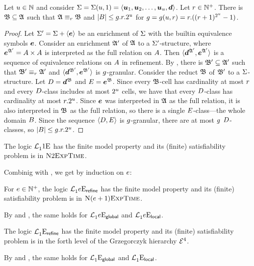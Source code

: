 \begin{remark}\label{rem:monadic-1}
Let $u \in \mathbb{N}$ and consider $\mathrm{\Sigma} = \mathrm{\Sigma}(u,1) =
\left\langle \bm{u}_{1},\bm{u}_{2},\dots,\bm{u}_{u},\bm{d} \right\rangle$. Let $r \in \mathbb{N}^{+}$.
There is $\mathfrak{B} \subseteq \mathfrak{A}$ such that $\mathfrak{A} \equiv_{r} \mathfrak{B}$ and
$\left|B\right| \leq g.r.2^u$ for $g = g(u, r) =
r.((r+1)^{2^u}-1)$.
\end{remark}
\begin{proof}
Let $\mathrm{\Sigma'} = \mathrm{\Sigma} + \left\langle \bm{e} \right\rangle$ be an enrichment of $\mathrm{\Sigma}$ with the builtin
equivalence symbols $\bm{e}$. Consider an enrichment $\mathfrak{A'}$ of $\mathfrak{A}$ to a
$\mathrm{\Sigma'}$-structure, where $\bm{e}^{\mathfrak{A'}} = {A\times A}$ is interpreted as the
full relation on $A$. Then $\langle \bm{d}^{\mathfrak{A'}}, \bm{e}^{\mathfrak{A'}} \rangle$ is a
sequence of equivalence relations on $A$ in refinement.
By , there is $\mathfrak{B'} \subseteq \mathfrak{A'}$ such that
$\mathfrak{B'} \equiv_{r} \mathfrak{A'}$ and $\langle \bm{d}^{\mathfrak{B'}},\bm{e}^{\mathfrak{B'}} \rangle$ is
$g$-granular.
Consider the reduct $\mathfrak{B}$ of $\mathfrak{B'}$ to a
$\mathrm{\Sigma}$-structure. Let $D = \bm{d}^{\mathfrak{B}}$ and $E = \bm{e}^{\mathfrak{B}}$.
Since every $\mathfrak{B}$-cell has
cardinality at most $r$ and every $D$-class includes at most $2^u$
cells, we have that every $D$-class has cardinality at most $r.2^u$.
Since $\bm{e}$ was interpreted in $\mathfrak{A}$ as the full relation, it is also
interpreted in $\mathfrak{B}$ as the full relation, so there is a single
$E$-class---the whole domain $B$.
Since the sequence $\left\langle D, E \right\rangle$ is $g$-granular, there are at most
$g$ $D$-classes, so $\left|B\right| \leq g.r.2^u$.
\end{proof}

\begin{corollary}\label{cor:monadic-base}
The logic $\mathcal{L}^{{}}_{1}{1}\mathrm{E}_{{}}$ has the finite model property and its
(finite) satisfiability problem is in $\text{\normalfont{\scshape N}}2\text{\normalfont{\scshape ExpTime}}$.
\end{corollary}

Combinig  with , we get by
induction on $e$:
\begin{proposition}
For $e \in \mathbb{N}^{+}$, the logic $\mathcal{L}^{{}}_{1}{e}\mathrm{E}_{\mathsf{refine}}$ has the finite
model property and its (finite) satisfiability problem is in
$\text{\normalfont{\scshape N}}(e+1)\text{\normalfont{\scshape ExpTime}}$.

By  and , the same
holds for $\mathcal{L}^{{}}_{1}{e}\mathrm{E}_{\mathsf{global}}$ and $\mathcal{L}^{{}}_{1}{e}\mathrm{E}_{\mathsf{local}}$.
\end{proposition}
\begin{proposition}
The logic $\mathcal{L}^{{}}_{1}{{}}\mathrm{E}_{\mathsf{refine}}$ has the finite
model property and its (finite) satisfiability problem is in the forth level of
the Grzegorczyk hierarchy $\mathcal{E}^{4}$.

By  and , the same holds
for $\mathcal{L}^{{}}_{1}{{}}\mathrm{E}_{\mathsf{global}}$ and $\mathcal{L}^{{}}_{1}{{}}\mathrm{E}_{\mathsf{local}}$.
\end{proposition}

